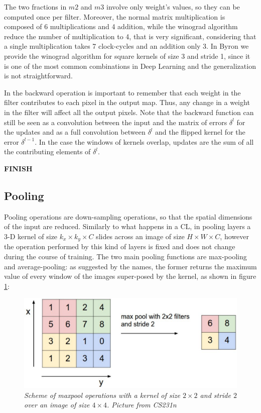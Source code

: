 \documentclass[12pt,a4paper]{report}
\begin{document}
The two fractions in $m2$ and $m3$ involve only weight's values, so they can be computed once per filter. Moreover, the normal matrix multiplication is composed of 6 multiplications and 4 addition, while the winograd algorithm reduce the number of multiplication to 4, that is very significant, considering that a  single multiplication takes 7 clock-cycles and an addition only 3. 
In Byron we provide the winograd algorithm for square kernels of size 3 and stride 1, since it is one of the most common combinations in Deep Learning and the generalization is not straightforward.

In the backward operation is important to remember that each weight in the filter contributes to each pixel in the output map. 
Thus, any change in a weight in the filter will affect all the output pixels. 
Note that the backward function can still be seen as a convolution between the input and the matrix of errors $\delta^l$ for the updates and as a full convolution between $\delta^l$ and the flipped kernel for the error $\delta^{l-1}$.
In the case the windows of kernels overlap, updates are the sum of all the contributing elements of $\delta^l$.

{\bf FINISH}

\subsection*{Pooling}

Pooling operations are down-sampling operations, so that the spatial dimensions of the input are reduced. Similarly to what happens in a CL, in pooling layers a 3-D kernel of size $k_x \times k_y \times C$ slides across an image of size $H \times W \times C$, however the operation performed by this kind of layers is fixed and does not change during the course of training.
The two main pooling functions are max-pooling and average-pooling: as suggested by the names, the former  
returns the maximum value of every window of the images super-posed by the kernel, as shown in figure \ref{fig:maxpool}:

\begin{figure}[h]
 \centering
 \includegraphics[scale=0.35]{./images/maxpool.png}
 \caption{\it Scheme of maxpool operations with a kernel of size $2 \times 2$ and stride $2$ over an image of size $4 \times 4$. Picture from CS231n}
 \label{fig:maxpool}
\end{figure}
\end{document}
